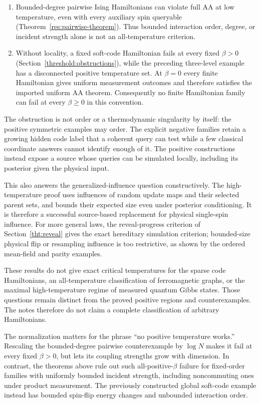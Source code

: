 \begin{enumerate}
$\beta\Lambda\le e^{-k(2+\frac12\log2)}/(32ek)$, where
$\Lambda=\max_i\sum_{A\ni i}\|h_A\|$ includes physical one-site
terms (Corollary~\ref{cor:quantum-clusters-full-aa}). The proof controls
every effective classical interaction via a convergent expansion.
\item Bounded-degree pairwise Ising Hamiltonians can violate full AA
at low temperature, even with every auxiliary spin queryable
(Theorem~\ref{res:pairwise-theorem}). Thus bounded interaction order,
degree, or incident strength alone is not an all-temperature criterion.
\item Without locality, a fixed soft-code Hamiltonian fails at every
fixed $\beta>0$ (Section~\ref{threshold:obstructions}), while
the preceding three-level example has a disconnected positive
temperature set. At $\beta=0$ every finite Hamiltonian gives uniform
measurement outcomes and therefore satisfies the imported uniform AA
theorem. Consequently no finite Hamiltonian family can fail at every
$\beta\ge0$ in this convention.
\end{enumerate}

The obstruction is not order or a thermodynamic singularity by itself:
the positive symmetric examples may order. The explicit negative
families retain a growing hidden code label that a coherent query can
test while a few classical coordinate answers cannot identify enough
of it. The positive constructions instead expose a source whose
queries can be simulated locally, including its posterior given the
physical input.

This also answers the generalized-influence question constructively.
The high-temperature proof uses influences of random update maps and
their selected parent sets, and bounds their expected size even under
posterior conditioning. It is therefore a successful source-based
replacement for physical single-spin influence. For more general
laws, the reveal-progress criterion of
Section~\ref{tht:reveal} gives the exact hereditary simulation
criterion; bounded-size physical flip or resampling influence is too
restrictive, as shown by the ordered mean-field and parity examples.

These results do not give exact critical temperatures for the sparse
code Hamiltonians, an all-temperature classification of ferromagnetic
graphs, or the maximal high-temperature regime of measured quantum
Gibbs states. Those questions remain distinct from the proved positive
regions and counterexamples. The notes therefore do not claim a
complete classification of arbitrary Hamiltonians.

The normalization matters for the phrase ``no positive temperature
works.'' Rescaling the bounded-degree pairwise counterexample by
$\log N$ makes it fail at every fixed $\beta>0$, but lets its coupling
strengths grow with dimension. In contrast, the theorems above rule
out such all-positive-$\beta$ failure for fixed-order families with
uniformly bounded incident strength, including noncommuting ones
under product measurement. The previously constructed global soft-code
example instead has bounded spin-flip energy changes and unbounded
interaction order.

